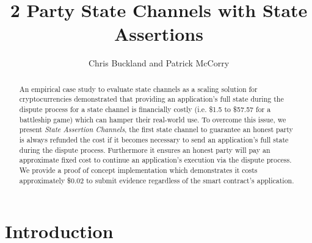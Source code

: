 \documentclass{llncs}
\begin{document}
	\title{2 Party State Channels with State Assertions } 
	
	\author{Chris Buckland and Patrick McCorry}
	
	
	
	\maketitle
	\begin{abstract}
	An empirical case study to evaluate state channels as a scaling solution for cryptocurrencies demonstrated that providing an application's full state during the dispute process for a state channel is financially costly (i.e. \$1.5 to \$57.57 for a battleship game) which can hamper their real-world use. 
	To overcome this issue, we present \emph{State Assertion Channels}, the first state channel to guarantee  an honest party is always refunded the cost if it becomes necessary to send an application's full state during the dispute process. 
	Furthermore it ensures an honest party will pay an approximate fixed cost to continue an application's execution via the dispute process. 
	We provide a proof of concept implementation which demonstrates it costs approximately \$0.02 to submit evidence  regardless of the smart contract's application. 

	\end{abstract} 

\section{Introduction}
\end{document}
